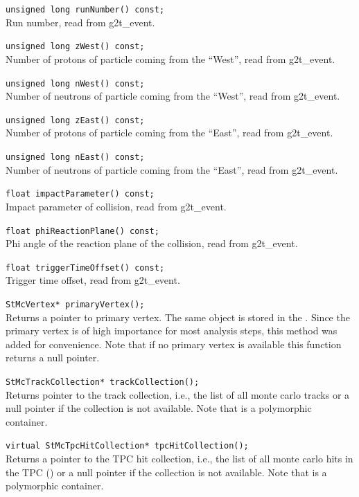 \begin{Entry}
    \verb+unsigned long runNumber() const;+\\
    Run number, read from g2t\_event.

    \verb+unsigned long zWest() const;+\\
    Number of protons of particle coming from the ``West'', read from g2t\_event.

    \verb+unsigned long nWest() const;+\\
    Number of neutrons of particle coming from the ``West'', read from g2t\_event.

    \verb+unsigned long zEast() const;+\\
    Number of protons of particle coming from the ``East'', read from g2t\_event.

    \verb+unsigned long nEast() const;+\\
    Number of neutrons of particle coming from the ``East'', read from g2t\_event.

    \verb+float impactParameter() const;+\\
    Impact parameter of collision, read from g2t\_event.

    \verb+float phiReactionPlane() const;+\\
    Phi angle of the reaction plane of the collision, read from g2t\_event.

    \verb+float triggerTimeOffset() const;+\\
    Trigger time offset, read from g2t\_event.

    \verb+StMcVertex* primaryVertex();+\\
    Returns a pointer to primary vertex. The same object is stored
    in the . Since the primary vertex is of
    high importance for most analysis steps, this method was added
    for convenience. Note that if no primary vertex is available
    this function returns a null pointer.

    \verb+StMcTrackCollection* trackCollection();+\\
    Returns pointer to the track collection, i.e., the list of all
    monte carlo tracks or a null pointer
    if the collection is not available.
    Note that  is a polymorphic container.

    \verb+virtual StMcTpcHitCollection* tpcHitCollection();+\\ 
    Returns a pointer to the TPC hit collection, i.e., the list of all
    monte carlo hits in the TPC () or a null pointer
    if the collection is not available.
    Note that  is a polymorphic container.


\end{Entry}
